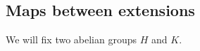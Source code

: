 %
%














\newpage
\subsection{Maps between extensions}
We will fix two abelian groups $H$ and $K$.



